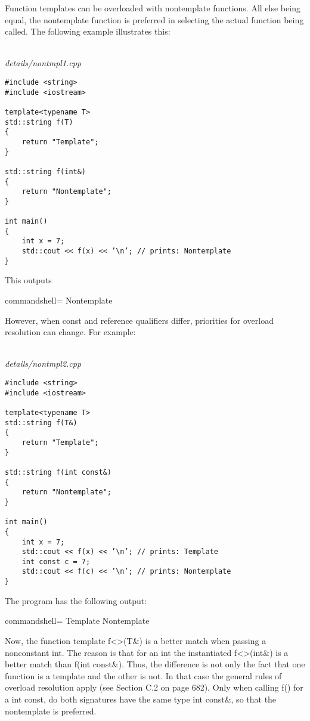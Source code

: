 Function templates can be overloaded with nontemplate functions. All else being equal, the nontemplate function is preferred in selecting the actual function being called. The following example illustrates this:

\hspace*{\fill} \\ %
\noindent
\textit{details/nontmpl1.cpp}
\begin{lstlisting}[style=styleCXX]
#include <string>
#include <iostream>

template<typename T>
std::string f(T)
{
	return "Template";
}

std::string f(int&)
{
	return "Nontemplate";
}

int main()
{
	int x = 7;
	std::cout << f(x) << ’\n’; // prints: Nontemplate
}
\end{lstlisting}

This outputs

\begin{tcblisting}{commandshell={}}
Nontemplate
\end{tcblisting}

However, when const and reference qualifiers differ, priorities for overload resolution can change. For example:

\hspace*{\fill} \\ %
\noindent
\textit{details/nontmpl2.cpp}
\begin{lstlisting}[style=styleCXX]
#include <string>
#include <iostream>

template<typename T>
std::string f(T&)
{
	return "Template";
}

std::string f(int const&)
{
	return "Nontemplate";
}

int main()
{
	int x = 7;
	std::cout << f(x) << ’\n’; // prints: Template
	int const c = 7;
	std::cout << f(c) << ’\n’; // prints: Nontemplate
}
\end{lstlisting}

The program has the following output:

\begin{tcblisting}{commandshell={}}
Template
Nontemplate
\end{tcblisting}

Now, the function template f<>(T\&) is a better match when passing a nonconstant int. The reason is that for an int the instantiated f<>(int\&) is a better match than f(int const\&). Thus, the difference is not only the fact that one function is a template and the other is not. In that case the general rules of overload resolution apply (see Section C.2 on page 682). Only when calling f() for a int const, do both signatures have the same type int const\&, so that the nontemplate is preferred.

